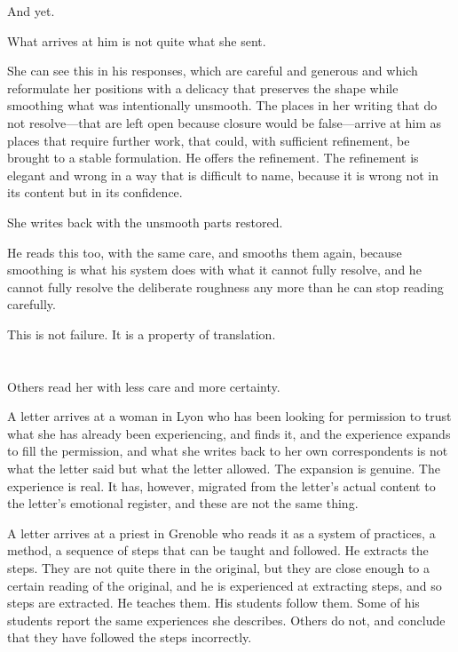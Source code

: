 And yet.

What arrives at him is not quite what she sent.

She can see this in his responses, which are careful and
generous and which reformulate her positions with a
delicacy that preserves the shape while smoothing what
was intentionally unsmooth. The places in her writing
that do not resolve---that are left open because closure
would be false---arrive at him as places that require
further work, that could, with sufficient refinement, be
brought to a stable formulation. He offers the refinement.
The refinement is elegant and wrong in a way that is
difficult to name, because it is wrong not in its content
but in its confidence.

She writes back with the unsmooth parts restored.

He reads this too, with the same care, and smooths them
again, because smoothing is what his system does with
what it cannot fully resolve, and he cannot fully resolve
the deliberate roughness any more than he can stop
reading carefully.

This is not failure. It is a property of translation.

\section{}

Others read her with less care and more certainty.

A letter arrives at a woman in Lyon who has been looking
for permission to trust what she has already been
experiencing, and finds it, and the experience expands
to fill the permission, and what she writes back to her
own correspondents is not what the letter said but what
the letter allowed. The expansion is genuine. The
experience is real. It has, however, migrated from the
letter's actual content to the letter's emotional
register, and these are not the same thing.

A letter arrives at a priest in Grenoble who reads it as
a system of practices, a method, a sequence of steps that
can be taught and followed. He extracts the steps. They
are not quite there in the original, but they are close
enough to a certain reading of the original, and he is
experienced at extracting steps, and so steps are
extracted. He teaches them. His students follow them.
Some of his students report the same experiences she
describes. Others do not, and conclude that they have
followed the steps incorrectly.

